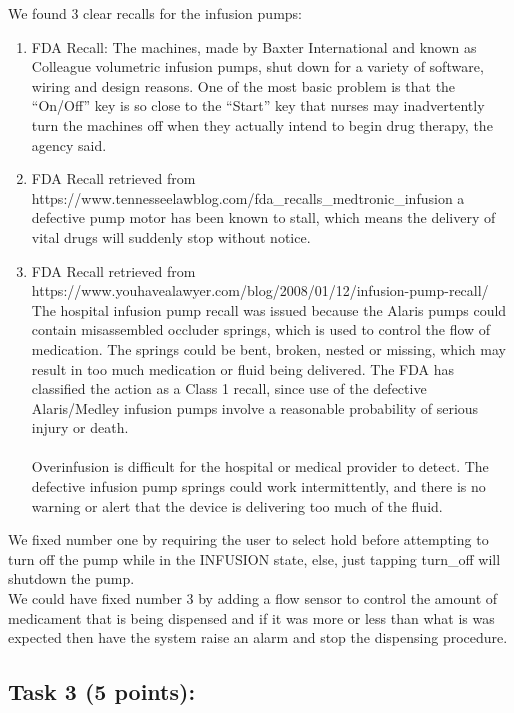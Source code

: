 ﻿\documentclass{article}
\newcommand{\head}{\subsection*}
\begin{document}
\begin{enumerate}
We found 3 clear recalls for the infusion pumps: \\
      \begin{enumerate}
      \item FDA Recall: The machines, made by Baxter International and known as Colleague volumetric infusion pumps, shut down for a variety of software, wiring and design reasons. One of the most basic problem is that the ``On/Off'' key is so close to the ``Start'' key that nurses may inadvertently turn the machines off when they actually intend to begin drug therapy, the agency said.
      \item FDA Recall retrieved from https://www.tennesseelawblog.com/fda\_recalls\_medtronic\_infusion a defective pump motor has been known to stall, which means the delivery of vital drugs will suddenly stop without notice.
      \item FDA Recall retrieved from https://www.youhavealawyer.com/blog/2008/01/12/infusion-pump-recall/ The hospital infusion pump recall was issued because the Alaris pumps could contain misassembled occluder springs, which is used to control the flow of medication. The springs could be bent, broken, nested or missing, which may result in too much medication or fluid being delivered. The FDA has classified the action as a Class 1 recall, since use of the defective Alaris/Medley infusion pumps involve a reasonable probability of serious injury or death.\\
\\
Overinfusion is difficult for the hospital or medical provider to detect. The defective infusion pump springs could work intermittently, and there is no warning or alert that the device is delivering too much of the fluid. 
      \end{enumerate}


\end{enumerate}


We fixed number one by requiring the user to select hold before attempting to turn off the pump while in the INFUSION state, else, just tapping turn\_off will shutdown the pump.\\


We could have fixed number 3 by adding a flow sensor to control the amount of medicament that is being dispensed and if it was more or less than what is was expected then have the system raise an alarm and stop the dispensing procedure.


\head{Task 3 (5 points):}
\end{document}
